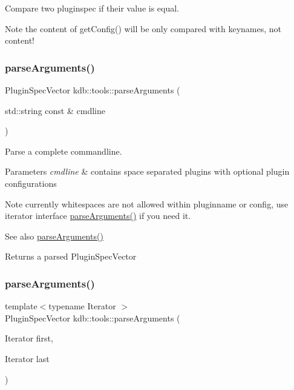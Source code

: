 Compare two pluginspec if their value is equal. 

\begin{DoxyNote}{Note}
the content of get\+Config() will be only compared with keynames, not content! 
\end{DoxyNote}
\mbox{\label{namespacekdb_1_1tools_a3c08f8fdabc7002ff497b247cba6bb21}} 
\subsubsection{\texorpdfstring{parse\+Arguments()}{parseArguments()}\hspace{0.1cm}{\footnotesize\ttfamily [1/2]}}
{\footnotesize\ttfamily Plugin\+Spec\+Vector kdb\+::tools\+::parse\+Arguments (\begin{DoxyParamCaption}\item[{std\+::string const \&}]{cmdline }\end{DoxyParamCaption})}



Parse a complete commandline. 


\begin{DoxyParams}{Parameters}
{\em cmdline} & contains space separated plugins with optional plugin configurations\\
\hline
\end{DoxyParams}
\begin{DoxyNote}{Note}
currently whitespaces are not allowed within pluginname or config, use iterator interface \hyperlink{namespacekdb_1_1tools_a3c08f8fdabc7002ff497b247cba6bb21}{parse\+Arguments()} if you need it.
\end{DoxyNote}
\begin{DoxySeeAlso}{See also}
\hyperlink{namespacekdb_1_1tools_a3c08f8fdabc7002ff497b247cba6bb21}{parse\+Arguments()} 
\end{DoxySeeAlso}
\begin{DoxyReturn}{Returns}
a parsed Plugin\+Spec\+Vector 
\end{DoxyReturn}
\mbox{\label{namespacekdb_1_1tools_ab7ffe14ed9cab32c07ddb55a8a65973a}} 
\subsubsection{\texorpdfstring{parse\+Arguments()}{parseArguments()}\hspace{0.1cm}{\footnotesize\ttfamily [2/2]}}
{\footnotesize\ttfamily template$<$typename Iterator $>$ \\
Plugin\+Spec\+Vector kdb\+::tools\+::parse\+Arguments (\begin{DoxyParamCaption}\item[{Iterator}]{first,  }\item[{Iterator}]{last }\end{DoxyParamCaption})}



